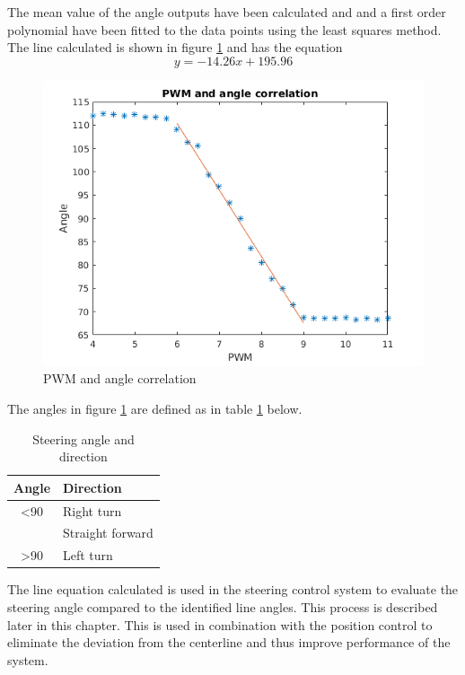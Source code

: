 The mean value of the angle outputs have been calculated and and a first order polynomial have been fitted to the data points using the least squares method. The line calculated is shown in figure  \ref{fig:PWM and angle correlation} and has the equation $$ y=-14.26x + 195.96$$ 

\begin{figure}[H]
  \includegraphics[width=\textwidth]{./img/PWMPLOT_2.png}
  \centering
  \caption{PWM and angle correlation}
  \label{fig:PWM and angle correlation}
\end{figure}

The angles in figure \ref{fig:PWM and angle correlation} are defined as in table \ref{Steering angle and direction} below.

\begin{table}[H]
\centering
\caption{Steering angle and direction}
\label{Steering angle and direction}
\begin{tabular}{@{} cl @{}}
\toprule
Angle		& Direction \\ 
\midrule
 \textless 90		& Right turn \\ 
  \: 90		& Straight forward \\ 
 \textgreater 90		& Left turn \\ 
\bottomrule
 \end{tabular}
\end{table}


The line equation calculated is used in the steering control system to evaluate the steering angle compared to the identified line angles. This process is described later in this chapter. This is used in combination with the position control to eliminate the deviation from the centerline and thus improve performance of the system.


